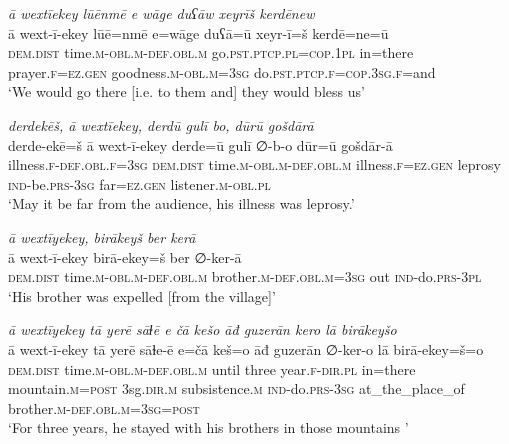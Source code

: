 \ea \label{DG.6}
\textit{ā wextīekey lūēnmē e wāge duʕāw xeyrīš kerdēnew} \\ 
\gll ā wext-ī-ekey lūē=nmē e=wāge duʕā=ū xeyr-ī=š kerdē=ne=ū \\ 
 \textsc{dem.dist} time\textsc{.m}\textsc{-obl}\textsc{.m}\textsc{-def}\textsc{.obl}\textsc{.m} go\textsc{.pst}\textsc{.ptcp}\textsc{.pl}\textsc{=cop}\textsc{.1pl} in=there prayer\textsc{\textsc{.f}}\textsc{=ez}\textsc{.gen} goodness\textsc{.m}\textsc{-obl}\textsc{.m}\textsc{=3sg} do\textsc{.pst}\textsc{.ptcp}\textsc{\textsc{.f}}\textsc{=cop}\textsc{.3sg}\textsc{\textsc{.f}}=and \\ 
\glt `We would go there [i.e. to them and] they would bless us'
\z 
 
\ea \label{DG.13}
\textit{derdekēš, ā wextīekey, derdū gulī bo, dūrū gošdārā} \\ 
\gll derde-ekē=š ā wext-ī-ekey derde=ū gulī ∅-b-o dūr=ū gošdār-ā \\ 
 illness\textsc{\textsc{.f}}\textsc{-def}\textsc{.obl}\textsc{\textsc{.f}}\textsc{=3sg} \textsc{dem.dist} time\textsc{.m}\textsc{-obl}\textsc{.m}\textsc{-def}\textsc{.obl}\textsc{.m} illness\textsc{\textsc{.f}}\textsc{=ez}\textsc{.gen} leprosy \textsc{ind-}be\textsc{.prs}\textsc{-3sg} far\textsc{=ez}\textsc{.gen} listener\textsc{.m}\textsc{-obl}\textsc{.pl} \\ 
\glt `May it be far from the audience, his illness was leprosy.'
\z 
 
\ea \label{DG.15}
\textit{ā wextīyekey, birākeyš ber kerā} \\ 
\gll ā wext-ī-ekey birā-ekey=š ber ∅-ker-ā \\ 
 \textsc{dem.dist} time\textsc{.m}\textsc{-obl}\textsc{.m}\textsc{-def}\textsc{.obl}\textsc{.m} brother\textsc{.m}\textsc{-def}\textsc{.obl}\textsc{.m}\textsc{=3sg} out \textsc{ind-}do\textsc{.prs}\textsc{-3pl} \\ 
\glt `His brother was expelled [from the village]'
\z 
 
\ea \label{DG.21}
\textit{ā wextīyekey tā yerē sāɫē e čā kešo āđ guzerān kero lā birākeyšo} \\ 
\gll ā wext-ī-ekey tā yerē sāɫe-ē e=čā keš=o āđ guzerān ∅-ker-o lā birā-ekey=š=o \\ 
 \textsc{dem.dist} time\textsc{.m}\textsc{-obl}\textsc{.m}\textsc{-def}\textsc{.obl}\textsc{.m} until three year\textsc{\textsc{.f}}\textsc{-dir}\textsc{.pl} in=there mountain\textsc{.m}\textsc{=\textsc{post}} 3sg\textsc{.dir}\textsc{.m} subsistence\textsc{.m} \textsc{ind-}do\textsc{.prs}\textsc{-3sg} at\_the\_place\_of brother\textsc{.m}\textsc{-def}\textsc{.obl}\textsc{.m}\textsc{=3sg}\textsc{=\textsc{post}} \\ 
\glt `For three years, he stayed with his brothers in those mountains '
\z 
 
